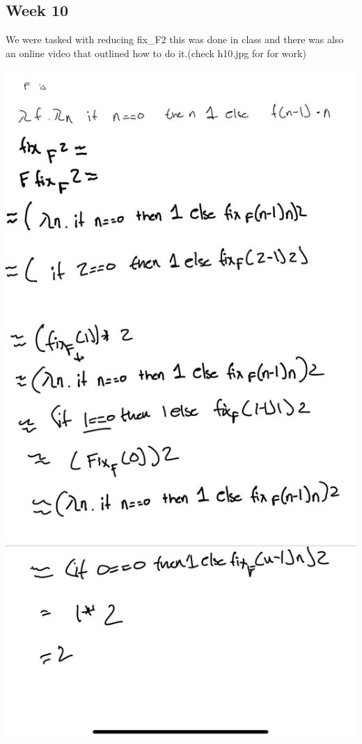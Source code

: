 \documentclass{article}
\theoremstyle{theorem}
\theoremstyle{definition}
\theoremstyle{remark}
\begin{document}
\subsection{Week 10}
    We were tasked with reducing fix\_F2 this was done in class and there was also an online video that outlined how to do it.(check h10.jpg for for work)
\begin{center}
\includegraphics[scale=0.2]{hw10.jpg}
\end{center}
\end{document}
